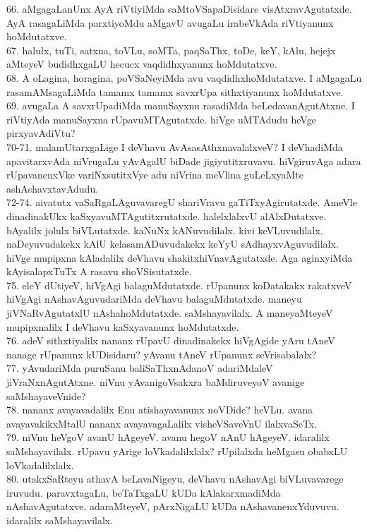 \documentclass{article}
\begin{document}
66. aMgagaLanUnx AyA riVtiyiMda saMtoVSapaDisidare visAtxravAgutatxde. AyA rasagaLiMda parxtiyoMdu aMgavU avugaLu irabeVkAda riVtiyanunx hoMdutatxve.\\
67. halulx, tuTi, satxna, toVLu, soMTa, paqSaThx, toDe, keY, kAlu, hejejx aMteyeV budidhxgaLU hecucx vaqdidhxyanunx hoMdutatxve.\\
68. A oLagina, horagina, poVSaNeyiMda avu vaqdidhxhoMdutatxve. I aMgagaLu rasamAMsagaLiMda tamamx tamamx savxrUpa sithxtiyanunx hoMdutatxve.\\
69. avugaLa A savxrUpadiMda manuSayxnu rasadiMda beLedavanAgutAtxne. I riVtiyAda manuSayxna rUpavuMTAgutatxde. hiVge uMTAdudu heVge pirxyavAdiVtu?\\
70-71. malamUtarxgaLige I deVhavu AvAsasAthxnavalalxveV? I deVhadiMda apavitarxvAda niVrugaLu yAvAgalU biDade jigiyutitxruvavu. hiVgiruvAga adara rUpavanenxVke variNxsutitxVye adu niVrina meVlina guLeLxyaMte ashAshavxtavAdudu.\\
72-74. aivatutx vaSaRgaLAguvavaregU shariVravu gaTiTxyAgirutatxde. AmeVle dinadinakUkx kaSxyavuMTAgutitxrutatxde. halelxlalxvU alAlxDutatxve. bAyalilx jolulx biVLutatxde. kaNuNx kANuvudilalx. kivi keVLuvudilalx. naDeyuvudakekx kAlU kelasamADuvudakekx keYyU sAdhayxvAguvudilalx. hiVge mupipxna kAladalilx deVhavu shakitxhiVnavAgutatxde. Aga aginxyiMda kAyisalapxTuTx A rasavu shoVSisutatxde.\\
75. eleY dUtiyeV, hiVgAgi balaguMdutatxde. rUpanunx koDatakakx rakatxveV hiVgAgi nAshavAguvudariMda deVhavu balaguMdutatxde. maneyu jiVNaRvAgutatxlU nAshahoMdutatxde. saMshayavilalx. A maneyaMteyeV mupipxnalilx I deVhavu kaSxyavanunx hoMdutatxde.\\
76. adeV sithxtiyalilx nananx rUpavU dinadinakekx hiVgAgide yAru tAneV nanage rUpanunx kUDisidaru? yAvanu tAneV rUpanunx seVrisabalalx?\\
77. yAvudariMda puruSanu baliSaThxnAdanoV adariMdaleV jiVraNxnAgutAtxne. niVnu yAvanigoVsakxra baMdiruveyoV avanige saMshayaveVnide?\\
78. nananx avayavadalilx Enu atishayavanunx noVDide? heVLu. avana avayavakikxMtalU nananx avayavagaLalilx visheVSaveVnU ilalxvaSeTx.\\
79. niVnu heVgoV avanU hAgeyeV. avanu hegoV nAnU hAgeyeV. idaralilx saMshayavilalx. rUpavu yArige loVkadalilxlalx? rUpilalxda heMgasu obabxLU loVkadalilxlalx.\\
80. utakxSaRteyu athavA beLavaNigeyu, deVhavu nAshavAgi biVLuvavarege iruvudu. paravxtagaLu, beTaTxgaLU kUDa kAlakarxmadiMda nAshavAgutatxve. adaraMteyeV, pArxNigaLU kUDa nAshavanenxYduvuvu. idaralilx saMshayavilalx.\\
\end{document}

